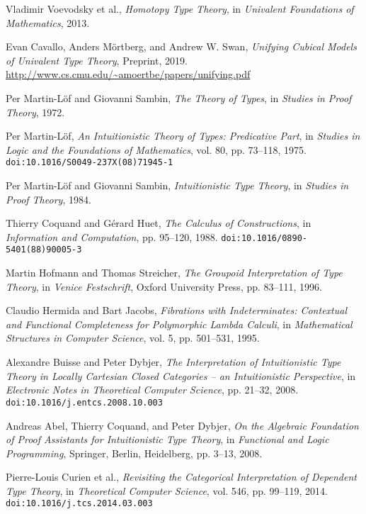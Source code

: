 \documentclass{article}
\begin{document}
\begin{thebibliography}{99}

Vladimir Voevodsky et al.,
\textit{Homotopy Type Theory},
in \textit{Univalent Foundations of Mathematics},
2013.

Evan Cavallo, Anders Mörtberg, and Andrew W. Swan,
\textit{Unifying Cubical Models of Univalent Type Theory},
Preprint, 2019.
\url{http://www.cs.cmu.edu/~amoertbe/papers/unifying.pdf}

Per Martin-Löf and Giovanni Sambin,
\textit{The Theory of Types},
in \textit{Studies in Proof Theory},
1972.

Per Martin-Löf,
\textit{An Intuitionistic Theory of Types: Predicative Part},
in \textit{Studies in Logic and the Foundations of Mathematics},
vol. 80, pp. 73–118, 1975.
\texttt{doi:10.1016/S0049-237X(08)71945-1}

Per Martin-Löf and Giovanni Sambin,
\textit{Intuitionistic Type Theory},
in \textit{Studies in Proof Theory},
1984.

Thierry Coquand and Gérard Huet,
\textit{The Calculus of Constructions},
in \textit{Information and Computation},
pp. 95–120, 1988.
\texttt{doi:10.1016/0890-5401(88)90005-3}

Martin Hofmann and Thomas Streicher,
\textit{The Groupoid Interpretation of Type Theory},
in \textit{Venice Festschrift},
Oxford University Press, pp. 83–111, 1996.

Claudio Hermida and Bart Jacobs,
\textit{Fibrations with Indeterminates: Contextual and Functional Completeness for Polymorphic Lambda Calculi},
in \textit{Mathematical Structures in Computer Science},
vol. 5, pp. 501–531, 1995.

Alexandre Buisse and Peter Dybjer,
\textit{The Interpretation of Intuitionistic Type Theory in Locally Cartesian Closed Categories -- an Intuitionistic Perspective},
in \textit{Electronic Notes in Theoretical Computer Science},
pp. 21–32, 2008.
\texttt{doi:10.1016/j.entcs.2008.10.003}

Andreas Abel, Thierry Coquand, and Peter Dybjer,
\textit{On the Algebraic Foundation of Proof Assistants for Intuitionistic Type Theory},
in \textit{Functional and Logic Programming},
Springer, Berlin, Heidelberg, pp. 3–13, 2008.

Pierre-Louis Curien et al.,
\textit{Revisiting the Categorical Interpretation of Dependent Type Theory},
in \textit{Theoretical Computer Science},
vol. 546, pp. 99–119, 2014.
\texttt{doi:10.1016/j.tcs.2014.03.003}


\end{thebibliography}
\end{document}
